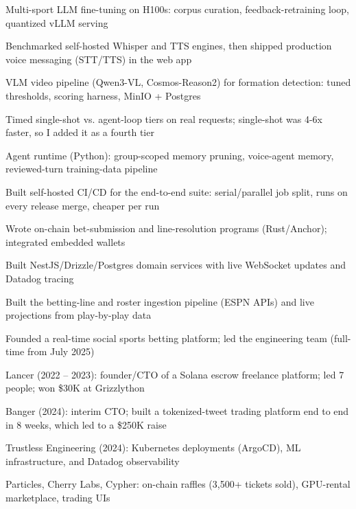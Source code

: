 \documentclass[print]{jack-resume}
\begin{document}
\begin{tightemize}
    \item Multi-sport LLM fine-tuning on H100s: corpus curation, feedback-retraining loop, quantized vLLM serving
    \item Benchmarked self-hosted Whisper and TTS engines, then shipped production voice messaging (STT/TTS) in the web app
    \item VLM video pipeline (Qwen3-VL, Cosmos-Reason2) for formation detection: tuned thresholds, scoring harness, MinIO + Postgres
    \item Timed single-shot vs. agent-loop tiers on real requests; single-shot was 4-6x faster, so I added it as a fourth tier
    \item Agent runtime (Python): group-scoped memory pruning, voice-agent memory, reviewed-turn training-data pipeline
    \item Built self-hosted CI/CD for the end-to-end suite: serial/parallel job split, runs on every release merge, cheaper per run
\end{tightemize}
\sectionsep

\begin{tightemize}
    \item Wrote on-chain bet-submission and line-resolution programs (Rust/Anchor); integrated embedded wallets
    \item Built NestJS/Drizzle/Postgres domain services with live WebSocket updates and Datadog tracing
    \item Built the betting-line and roster ingestion pipeline (ESPN APIs) and live projections from play-by-play data
    \item Founded a real-time social sports betting platform; led the engineering team (full-time from July 2025)
\end{tightemize}
\sectionsep

\begin{tightemize}
    \item Lancer (2022 – 2023): founder/CTO of a Solana escrow freelance platform; led 7 people; won \$30K at Grizzlython
    \item Banger (2024): interim CTO; built a tokenized-tweet trading platform end to end in 8 weeks, which led to a \$250K raise
    \item Trustless Engineering (2024): Kubernetes deployments (ArgoCD), ML infrastructure, and Datadog observability
    \item Particles, Cherry Labs, Cypher: on-chain raffles (3,500+ tickets sold), GPU-rental marketplace, trading UIs
\end{tightemize}
\sectionsep
\end{document}
